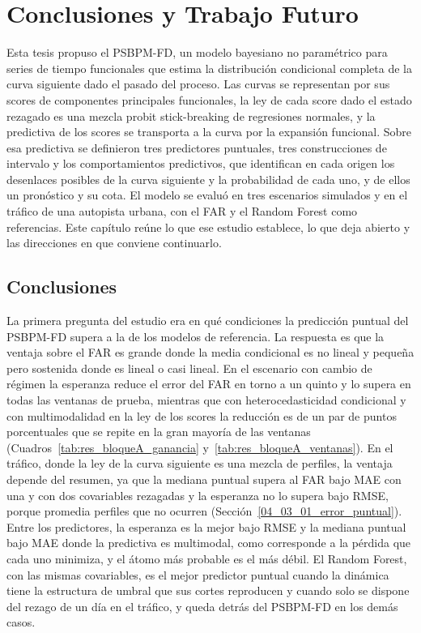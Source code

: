 \chapter{Conclusiones y Trabajo Futuro}
\label{05_00_00_conclusiones}

Esta tesis propuso el PSBPM-FD, un modelo bayesiano no paramétrico para series de tiempo funcionales que estima la distribución condicional completa de la curva siguiente dado el pasado del proceso. Las curvas se representan por sus scores de componentes principales funcionales, la ley de cada score dado el estado rezagado es una mezcla probit stick-breaking de regresiones normales, y la predictiva de los scores se transporta a la curva por la expansión funcional. Sobre esa predictiva se definieron tres predictores puntuales, tres construcciones de intervalo y los comportamientos predictivos, que identifican en cada origen los desenlaces posibles de la curva siguiente y la probabilidad de cada uno, y de ellos un pronóstico y su cota. El modelo se evaluó en tres escenarios simulados y en el tráfico de una autopista urbana, con el FAR y el Random Forest como referencias. Este capítulo reúne lo que ese estudio establece, lo que deja abierto y las direcciones en que conviene continuarlo.

\section{Conclusiones}
\label{05_01_00_conclusiones}

La primera pregunta del estudio era en qué condiciones la predicción puntual del PSBPM-FD supera a la de los modelos de referencia. La respuesta es que la ventaja sobre el FAR es grande donde la media condicional es no lineal y pequeña pero sostenida donde es lineal o casi lineal. En el escenario con cambio de régimen la esperanza reduce el error del FAR en torno a un quinto y lo supera en todas las ventanas de prueba, mientras que con heterocedasticidad condicional y con multimodalidad en la ley de los scores la reducción es de un par de puntos porcentuales que se repite en la gran mayoría de las ventanas (Cuadros~\ref{tab:res_bloqueA_ganancia} y~\ref{tab:res_bloqueA_ventanas}). En el tráfico, donde la ley de la curva siguiente es una mezcla de perfiles, la ventaja depende del resumen, ya que la mediana puntual supera al FAR bajo MAE con una y con dos covariables rezagadas y la esperanza no lo supera bajo RMSE, porque promedia perfiles que no ocurren (Sección~\ref{04_03_01_error_puntual}). Entre los predictores, la esperanza es la mejor bajo RMSE y la mediana puntual bajo MAE donde la predictiva es multimodal, como corresponde a la pérdida que cada uno minimiza, y el átomo más probable es el más débil. El Random Forest, con las mismas covariables, es el mejor predictor puntual cuando la dinámica tiene la estructura de umbral que sus cortes reproducen y cuando solo se dispone del rezago de un día en el tráfico, y queda detrás del PSBPM-FD en los demás casos.\\

